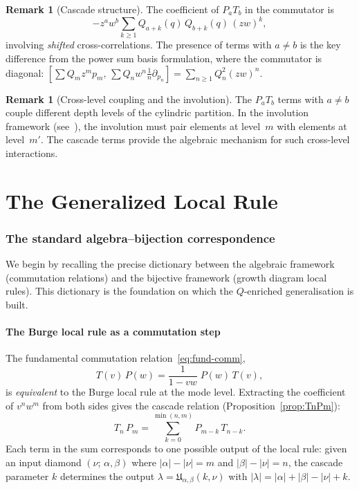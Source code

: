 \documentclass[11pt]{article}
\theoremstyle{plain}
\theoremstyle{definition}
\newtheorem{remark}[theorem]{Remark}
\begin{document}
\begin{remark}[Cascade structure]
The coefficient of $P_a T_b$ in the commutator is
\[
  -z^a w^b \sum_{k \geq 1} Q_{a+k}(q)\, Q_{b+k}(q)\, (zw)^k,
\]
involving \emph{shifted} cross-correlations.  The presence of terms
with $a \neq b$ is the key difference from the power sum basis
formulation, where the commutator is diagonal:
$[\sum Q_m z^m p_m,\, \sum Q_n w^n \frac{1}{n}\partial_{p_n}]
= \sum_{n \geq 1} Q_n^2 (zw)^n$.
\end{remark}

\begin{remark}[Cross-level coupling and the involution]
The $P_a T_b$ terms with $a \neq b$ couple different depth levels of
the cylindric partition.  In the involution framework
(see~\cite{FIRST_ATTEMPT}), the involution must pair elements at
level~$m$ with elements at level~$m'$.  The cascade terms provide
the algebraic mechanism for such cross-level interactions.
\end{remark}



\part{The Generalized Local Rule}


\section{The standard algebra--bijection correspondence}
\label{sec:std-correspondence}

We begin by recalling the precise dictionary between the algebraic
framework (commutation relations) and the bijective framework
(growth diagram local rules).  This dictionary is the foundation on
which the $Q$-enriched generalisation is built.

\subsection{The Burge local rule as a commutation step}

The fundamental commutation relation~\eqref{eq:fund-comm},
\[
  T(v)\, P(w) = \frac{1}{1 - vw}\; P(w)\, T(v),
\]
is \emph{equivalent} to the Burge local rule at the mode level.
Extracting the coefficient of $v^n w^m$ from both sides gives the
cascade relation (Proposition~\ref{prop:TnPm}):
\begin{equation}\label{eq:cascade-recap}
  T_n\, P_m = \sum_{k=0}^{\min(n,m)} P_{m-k}\, T_{n-k}.
\end{equation}
Each term in the sum corresponds to one possible output of the
local rule: given an input diamond $(\nu;\, \alpha, \beta)$ where
$|\alpha| - |\nu| = m$ and $|\beta| - |\nu| = n$, the cascade
parameter $k$ determines the output
$\lambda = \mathfrak{U}_{\alpha,\beta}(k,\nu)$ with
$|\lambda| = |\alpha| + |\beta| - |\nu| + k$.
\end{document}
